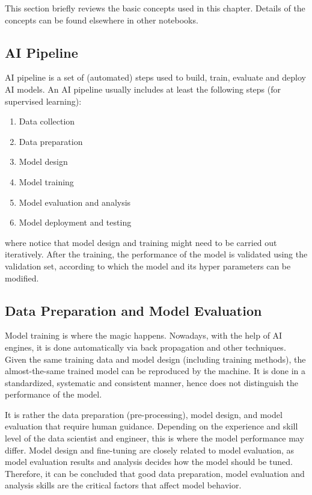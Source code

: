 This section briefly reviews the basic concepts used in this chapter. Details of the concepts can be found elsewhere in other notebooks.

\subsection{AI Pipeline}

AI pipeline is a set of (automated) steps used to build, train, evaluate and deploy AI models. An AI pipeline usually includes at least the following steps (for supervised learning):
\begin{enumerate}
  \item Data collection
  \item Data preparation
  \item Model design
  \item Model training
  \item Model evaluation and analysis
  \item Model deployment and testing
\end{enumerate}
where notice that model design and training might need to be carried out iteratively. After the training, the performance of the model is validated using the validation set, according to which the model and its hyper parameters can be modified.

\subsection{Data Preparation and Model Evaluation}

Model training is where the magic happens. Nowadays, with the help of AI engines, it is done automatically via back propagation and other techniques. Given the same training data and model design (including training methods), the almost-the-same trained model can be reproduced by the machine. It is done in a standardized, systematic and consistent manner, hence does not distinguish the performance of the model.

It is rather the data preparation (pre-processing), model design, and model evaluation that require human guidance. Depending on the experience and skill level of the data scientist and engineer, this is where the model performance may differ. Model design and fine-tuning are closely related to model evaluation, as model evaluation results and analysis decides how the model should be tuned. Therefore, it can be concluded that good data preparation, model evaluation and analysis skills are the critical factors that affect model behavior.

